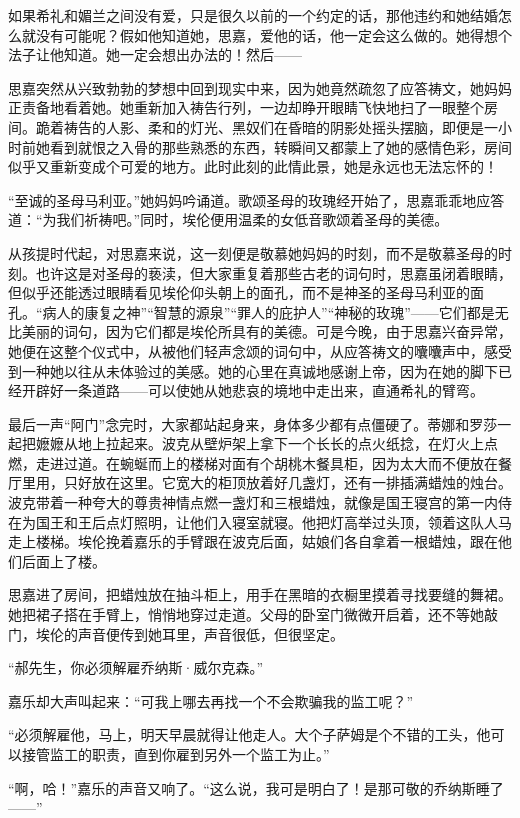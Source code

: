 \par 如果希礼和媚兰之间没有爱，只是很久以前的一个约定的话，那他违约和她结婚怎么就没有可能呢？假如他知道她，思嘉，爱他的话，他一定会这么做的。她得想个法子让他知道。她一定会想出办法的！然后——
\par 思嘉突然从兴致勃勃的梦想中回到现实中来，因为她竟然疏忽了应答祷文，她妈妈正责备地看着她。她重新加入祷告行列，一边却睁开眼睛飞快地扫了一眼整个房间。跪着祷告的人影、柔和的灯光、黑奴们在昏暗的阴影处摇头摆脑，即便是一小时前她看到就恨之入骨的那些熟悉的东西，转瞬间又都蒙上了她的感情色彩，房间似乎又重新变成个可爱的地方。此时此刻的此情此景，她是永远也无法忘怀的！
\par “至诚的圣母马利亚。”她妈妈吟诵道。歌颂圣母的玫瑰经开始了，思嘉乖乖地应答道：“为我们祈祷吧。”同时，埃伦便用温柔的女低音歌颂着圣母的美德。
\par 从孩提时代起，对思嘉来说，这一刻便是敬慕她妈妈的时刻，而不是敬慕圣母的时刻。也许这是对圣母的亵渎，但大家重复着那些古老的词句时，思嘉虽闭着眼睛，但似乎还能透过眼睛看见埃伦仰头朝上的面孔，而不是神圣的圣母马利亚的面孔。“病人的康复之神”“智慧的源泉”“罪人的庇护人”“神秘的玫瑰”——它们都是无比美丽的词句，因为它们都是埃伦所具有的美德。可是今晚，由于思嘉兴奋异常，她便在这整个仪式中，从被他们轻声念颂的词句中，从应答祷文的囔囔声中，感受到一种她以往从未体验过的美感。她的心里在真诚地感谢上帝，因为在她的脚下已经开辟好一条道路——可以使她从她悲哀的境地中走出来，直通希礼的臂弯。
\par 最后一声“阿门”念完时，大家都站起身来，身体多少都有点僵硬了。蒂娜和罗莎一起把嬷嬷从地上拉起来。波克从壁炉架上拿下一个长长的点火纸捻，在灯火上点燃，走进过道。在蜿蜒而上的楼梯对面有个胡桃木餐具柜，因为太大而不便放在餐厅里用，只好放在这里。它宽大的柜顶放着好几盏灯，还有一排插满蜡烛的烛台。波克带着一种夸大的尊贵神情点燃一盏灯和三根蜡烛，就像是国王寝宫的第一内侍在为国王和王后点灯照明，让他们入寝室就寝。他把灯高举过头顶，领着这队人马走上楼梯。埃伦挽着嘉乐的手臂跟在波克后面，姑娘们各自拿着一根蜡烛，跟在他们后面上了楼。
\par 思嘉进了房间，把蜡烛放在抽斗柜上，用手在黑暗的衣橱里摸着寻找要缝的舞裙。她把裙子搭在手臂上，悄悄地穿过走道。父母的卧室门微微开启着，还不等她敲门，埃伦的声音便传到她耳里，声音很低，但很坚定。
\par “郝先生，你必须解雇乔纳斯·威尔克森。”
\par 嘉乐却大声叫起来：“可我上哪去再找一个不会欺骗我的监工呢？”
\par “必须解雇他，马上，明天早晨就得让他走人。大个子萨姆是个不错的工头，他可以接管监工的职责，直到你雇到另外一个监工为止。”
\par “啊，哈！”嘉乐的声音又响了。“这么说，我可是明白了！是那可敬的乔纳斯睡了——”
